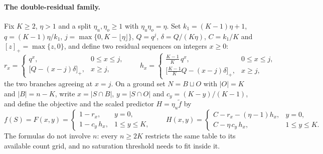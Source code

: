 \paragraph{The double-residual family.}
Fix $K\ge2$, $\eta>1$ and a split $\eta_u,\eta_o\ge1$ with
$\eta_u\eta_o=\eta$.  Set $k_1=(K-1)\eta+1$, $q=(K-1)\eta/k_1$,
$j=\max\{0,K-\lfloor\eta\rfloor\}$, $Q=q^{j}$, $\delta=Q/(K\eta)$,
$C=k_1/K$ and $[z]_+=\max\{z,0\}$, and define two residual sequences on
integers $x\ge0$:
\[
  r_x=\begin{cases}q^{x},&0\le x\le j,\\[2pt]
    \bigl[Q-(x-j)\delta\bigr]_+,&x\ge j,\end{cases}
  \qquad
  h_x=\begin{cases}\tfrac{K-1}{K}\,q^{x},&0\le x\le j,\\[2pt]
    \bigl[\tfrac{K-1}{K}Q-(x-j)\delta\bigr]_+,&x\ge j,\end{cases}
\]
the two branches agreeing at $x=j$.  On a ground set $N=B\sqcup O$ with
$|O|=K$ and $|B|=n-K$, write $x=|S\cap B|$, $y=|S\cap O|$ and
$c_y=(K-y)/(K-1)$, and define the objective and the scaled predictor
$H=\eta_u\tilde f$ by
\[
  f(S)=F(x,y)=\begin{cases}1-r_x,&y=0,\\1-c_y\,h_x,&1\le y\le K,\end{cases}
  \qquad
  H(x,y)=\begin{cases}C-r_x-(\eta-1)h_x,&y=0,\\
    C-\eta\,c_y\,h_x,&1\le y\le K.\end{cases}
\]
The formulas do not involve $n$: every $n\ge2K$ restricts the same table
to its available count grid, and no saturation threshold needs to fit
inside it.

